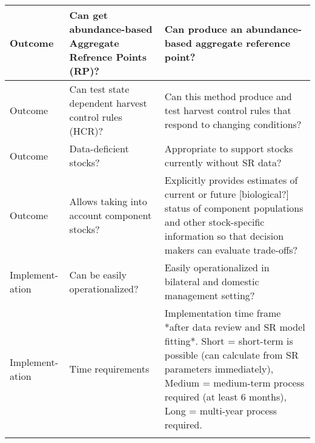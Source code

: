 \documentclass[french,11pt]{book}
\begin{document}
\begin{longtable}[t]{>{\raggedright\arraybackslash}p{4em}>{\raggedright\arraybackslash}p{14em}>{\raggedright\arraybackslash}p{28em}}
\midrule Outcome & Can get abundance-based Aggregate Refrence Points (RP)? & Can produce an abundance-based aggregate reference point?\\
\midrule Outcome & Can test state dependent harvest control rules (HCR)? & Can this method produce and test harvest control rules that respond to changing conditions?\\
\midrule Outcome & Data-deficient stocks? & Appropriate to support stocks currently without SR data?\\
\midrule Outcome & Allows taking into account component stocks? & Explicitly provides estimates of current or future [biological?] status of component populations and other stock-specific information so that decision makers can evaluate trade-offs?\\
\midrule Implement-ation & Can be easily operationalized? & Easily operationalized in bilateral and domestic management setting?\\
\midrule Implement-ation & Time requirements & Implementation time frame *after data review and SR model fitting*. Short = short-term is possible (can calculate from SR parameters immediately), Medium = medium-term process required (at least 6 months), Long = multi-year process required.\\* \end{longtable}

\endgroup{} \endgroup{}

\clearpage
\end{document}
